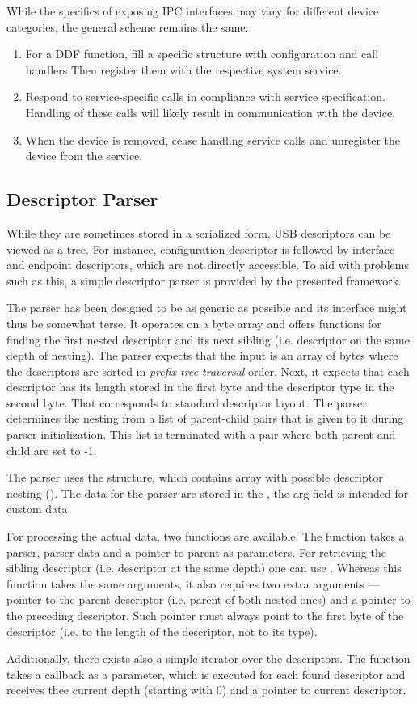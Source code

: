 While the specifics of exposing IPC interfaces may vary for different device
categories, the general scheme remains the same:
%
\begin{enumerate}
	\item For a DDF function, fill a specific structure with configuration and
		call handlers Then register them with the respective system service.
	\item Respond to service-specific calls in compliance with service
		specification. Handling of these calls will likely result in
		communication with the device.
	\item When the device is removed, cease handling service calls and
		unregister the device from the service.
\end{enumerate}


\subsection{Descriptor Parser}

While they are sometimes stored in a serialized form, USB descriptors can be
viewed as a tree. For instance, configuration descriptor is followed by
interface and endpoint descriptors, which are not directly accessible. To aid
with problems such as this, a simple descriptor parser is provided by the
presented framework.

The parser has been designed to be as generic as possible and its interface
might thus be somewhat terse. It operates on a byte array and offers functions
for finding the first nested descriptor and its next sibling (i.e. descriptor on
the same depth of nesting). The parser expects that the input is an array of
bytes where the descriptors are sorted in \textit{prefix tree traversal} order.
Next, it expects that each descriptor has its length stored in the first byte
and the descriptor type in the second byte. That corresponds to standard
descriptor layout. The parser determines the nesting from a list of parent-child
pairs that is given to it during parser initialization. This list is terminated
with a pair where both parent and child are set to -1.

The parser uses the  structure, which contains array
with possible descriptor nesting (). The
data for the parser are stored in the , the arg
field is intended for custom data.

For processing the actual data, two functions are available. The
 function takes a parser, parser data and
a pointer to parent as parameters. For retrieving the sibling descriptor (i.e.
descriptor at the same depth) one can use .
Whereas this function takes the same arguments, it also requires two extra
arguments — pointer to the parent descriptor (i.e. parent of both nested ones)
and a pointer to the preceding descriptor. Such pointer must always point to
the first byte of the descriptor (i.e. to the length of the descriptor, not to
its type).

Additionally, there exists also a simple iterator over the descriptors. The
function  takes a callback as a parameter, which is
executed for each found descriptor and receives thee current depth (starting
with 0) and a pointer to current descriptor.
